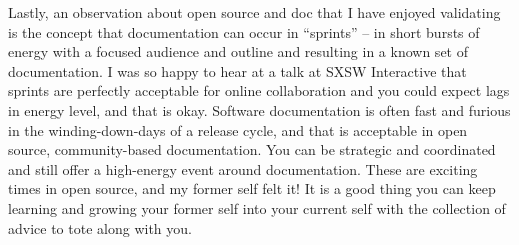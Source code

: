 Lastly, an observation about open source and doc that I have enjoyed validating is the concept that documentation can occur in ``sprints'' -- in short bursts of energy with a focused audience and outline and resulting in a known set of documentation. I was so happy to hear at a talk at SXSW Interactive that sprints are perfectly acceptable for online collaboration and you could expect lags in energy level, and that is okay. Software documentation is often fast and furious in the winding-down-days of a release cycle, and that is acceptable in open source, community-based documentation. You can be strategic and coordinated and still offer a high-energy event around documentation. These are exciting times in open source, and my former self felt it! It is a good thing you can keep learning and growing your former self into your current self with the collection of advice to tote along with you.
